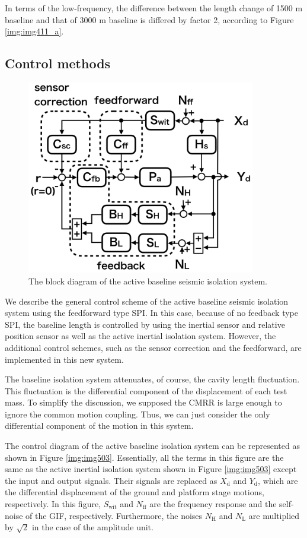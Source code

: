 In terms of the low-frequency, the difference between the length change of 1500 m baseline and that of 3000 m baseline is differed by factor 2, according to Figure \ref{img:img411_a}.

\subsection{Control methods} \label{sec:444}
\begin{figure}[h]
  \begin{center}   
    \includegraphics[width=10cm]{./img_chap5/img511.png}
    \caption{The block diagram of the active baseline seismic isolation system.} \label{img:img511}
  \end{center}
\end{figure}
We describe the general control scheme of the active baseline seismic isolation system using the feedforward type SPI. In this case, because of no feedback type SPI, the baseline length is controlled by using the inertial sensor and relative position sensor as well as the active inertial isolation system. However, the additional control schemes, such as the sensor correction and the feedforward, are implemented in this new system.

The baseline isolation system attenuates, of course, the cavity length fluctuation. This fluctuation is the differential component of the displacement of each test mass. To simplify the discussion, we supposed the CMRR is large enough to ignore the common motion coupling. Thus, we can just consider the only differential component of the motion in this system.

The control diagram of the active baseline isolation system can be represented as shown in Figure \ref{img:img503}. Essentially, all the terms in this figure are the same as the active inertial isolation system shown in Figure \ref{img:img503} except the input and output signals. Their signals are replaced as $X_{\mathrm{d}}$ and $Y_{\mathrm{d}}$, which are the differential displacement of the ground and platform stage motions, respectively. In this figure,  $S_{\mathrm{wit}}$ and $N_{\mathrm{ff}}$ are the frequency response and the self-noise of the GIF, respectively. Furthermore, the noises $N_{\mathrm{H}}$ and $N_{\mathrm{L}}$ are multiplied by $\sqrt{2}$ in the case of the amplitude unit.

